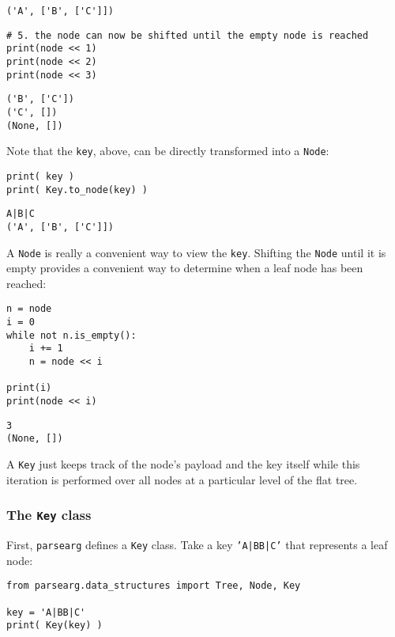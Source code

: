 \documentclass[10pt]{amsart}
\numberwithin{equation}{section}
\begin{document}
\begin{verbatim}
('A', ['B', ['C']])
\end{verbatim}


\begin{verbatim}
# 5. the node can now be shifted until the empty node is reached
print(node << 1)
print(node << 2)
print(node << 3)
\end{verbatim}

\begin{verbatim}
('B', ['C'])
('C', [])
(None, [])
\end{verbatim}


Note that the \texttt{key}, above, can be directly transformed into a \texttt{Node}:
\begin{verbatim}
print( key )
print( Key.to_node(key) )
\end{verbatim}

\begin{verbatim}
A|B|C
('A', ['B', ['C']])
\end{verbatim}


A \texttt{Node} is really a convenient way to view the \texttt{key}. Shifting the \texttt{Node}
until it is empty provides a convenient way to determine when a 
leaf node has been reached:
\begin{verbatim}
n = node
i = 0
while not n.is_empty():
    i += 1
    n = node << i  

print(i)
print(node << i)
\end{verbatim}

\begin{verbatim}
3
(None, [])
\end{verbatim}


A \texttt{Key} just keeps track of the node's payload and the key itself while
this iteration is performed over all nodes at a particular level of the 
flat tree.

\subsubsection{The \texttt{Key} class}
\label{sec:orga5ccad2}
First, \texttt{parsearg} defines a \texttt{Key} class. Take a key  \texttt{'A|BB|C'} that represents
a leaf node:
\begin{verbatim}
from parsearg.data_structures import Tree, Node, Key

key = 'A|BB|C'
print( Key(key) )
\end{verbatim}
\end{document}
